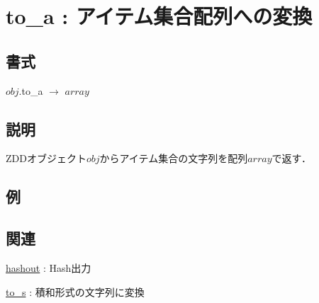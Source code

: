
\section{to\_a : アイテム集合配列への変換 \label{sect:to_a}}
\subsection*{書式}
$obj$.to\_a $\rightarrow$ $array$

\subsection*{説明}
ZDDオブジェクト$obj$からアイテム集合の文字列を配列$array$で返す．

\subsection*{例}


\subsection*{関連}
\hyperref[sect:hashout]{hashout} : Hash出力

\hyperref[sect:to_s]{to\_s} : 積和形式の文字列に変換

